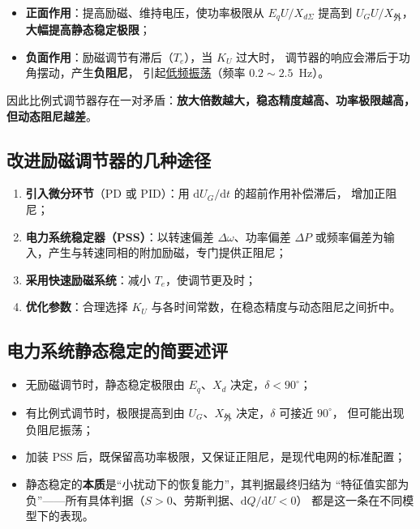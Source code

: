 \begin{itemize}
  \item \textbf{正面作用}：提高励磁、维持电压，使功率极限从 $E_qU/X_{d\Sigma}$ 提高到
        $U_GU/X_{\text{外}}$，\textbf{大幅提高静态稳定极限}；
  \item \textbf{负面作用}：励磁调节有滞后（$T_e$），当 $K_U$ 过大时，
        调节器的响应会滞后于功角摆动，产生\textbf{负阻尼}，
        引起\underline{低频振荡}（频率 $0.2\sim2.5$~Hz）。
\end{itemize}
因此比例式调节器存在一对矛盾：\textbf{放大倍数越大，稳态精度越高、功率极限越高，
但动态阻尼越差}。

\subsection{改进励磁调节器的几种途径}

\begin{enumerate}
  \item \textbf{引入微分环节}（PD 或 PID）：用 $\mathrm{d}U_G/\mathrm{d}t$ 的超前作用补偿滞后，
        增加正阻尼；
  \item \textbf{电力系统稳定器（PSS）}：以转速偏差 $\Delta\omega$、功率偏差 $\Delta P$
        或频率偏差为输入，产生与转速同相的附加励磁，专门提供正阻尼；
  \item \textbf{采用快速励磁系统}：减小 $T_e$，使调节更及时；
  \item \textbf{优化参数}：合理选择 $K_U$ 与各时间常数，在稳态精度与动态阻尼之间折中。
\end{enumerate}

\subsection{电力系统静态稳定的简要述评}

\begin{itemize}
  \item 无励磁调节时，静态稳定极限由 $E_q$、$X_d$ 决定，$\delta<90^\circ$；
  \item 有比例式调节时，极限提高到由 $U_G$、$X_{\text{外}}$ 决定，$\delta$ 可接近 $90^\circ$，
        但可能出现负阻尼振荡；
  \item 加装 PSS 后，既保留高功率极限，又保证正阻尼，是现代电网的标准配置；
  \item 静态稳定的\textbf{本质}是“小扰动下的恢复能力”，其判据最终归结为
        “特征值实部为负”——所有具体判据（$S>0$、劳斯判据、$\mathrm{d}Q/\mathrm{d}U<0$）
        都是这一条在不同模型下的表现。
\end{itemize}


